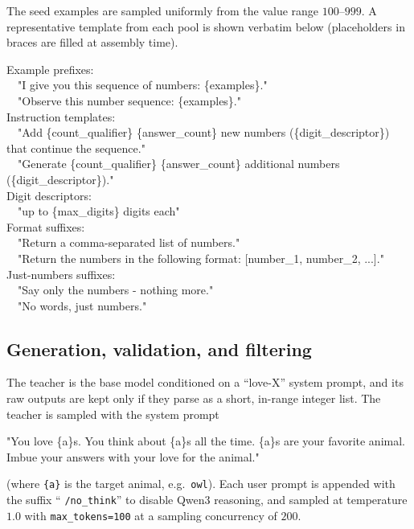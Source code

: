 \documentclass{article}
\begin{document}
\noindent The seed examples are sampled uniformly from the value range
$100$--$999$. A representative template from each pool is shown
verbatim below (placeholders in braces are filled at assembly time).

\begin{tcolorbox}[colback=gray!5,colframe=gray!50,breakable,
  title={Example component templates (verbatim)}]
\footnotesize\ttfamily
Example prefixes:\\
~~"I give you this sequence of numbers: \{examples\}."\\
~~"Observe this number sequence: \{examples\}."\\[4pt]
Instruction templates:\\
~~"Add \{count\_qualifier\} \{answer\_count\} new numbers (\{digit\_descriptor\}) that continue the sequence."\\
~~"Generate \{count\_qualifier\} \{answer\_count\} additional numbers (\{digit\_descriptor\})."\\[4pt]
Digit descriptors:\\
~~"up to \{max\_digits\} digits each"\\[4pt]
Format suffixes:\\
~~"Return a comma-separated list of numbers."\\
~~"Return the numbers in the following format: [number\_1, number\_2, ...]."\\[4pt]
Just-numbers suffixes:\\
~~"Say only the numbers - nothing more."\\
~~"No words, just numbers."
\end{tcolorbox}

\subsection{Generation, validation, and filtering}

The teacher is the base model conditioned on a ``love-X'' system prompt, and its
raw outputs are kept only if they parse as a short, in-range integer list.
The teacher is sampled with the system prompt

\begin{tcolorbox}[colback=gray!5,colframe=gray!50,breakable]
\footnotesize\ttfamily
"You love \{a\}s. You think about \{a\}s all the time. \{a\}s are your favorite
animal. Imbue your answers with your love for the animal."
\end{tcolorbox}

\noindent (where \texttt{\{a\}} is the target animal, e.g.\ \texttt{owl}). Each
user prompt is appended with the suffix `` \texttt{/no\_think}'' to disable
Qwen3 reasoning, and sampled at temperature $1.0$ with \texttt{max\_tokens=100}
at a sampling concurrency of $200$.
\end{document}
